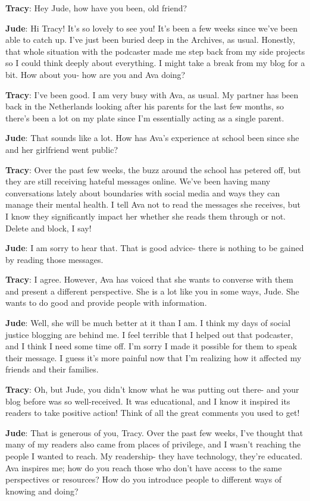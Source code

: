 \documentclass[
  letterpaper,
  DIV=11,
  numbers=noendperiod]{scrreprt}
\begin{document}
\textbf{Tracy}: Hey Jude, how have you been, old friend?

\textbf{Jude}: Hi Tracy! It's so lovely to see you! It's been a few
weeks since we've been able to catch up. I've just been buried deep in
the Archives, as usual. Honestly, that whole situation with the
podcaster made me step back from my side projects so I could think
deeply about everything. I might take a break from my blog for a bit.
How about you- how are you and Ava doing?

\textbf{Tracy}: I've been good. I am very busy with Ava, as usual. My
partner has been back in the Netherlands looking after his parents for
the last few months, so there's been a lot on my plate since I'm
essentially acting as a single parent.

\textbf{Jude}: That sounds like a lot. How has Ava's experience at
school been since she and her girlfriend went public?

\textbf{Tracy}: Over the past few weeks, the buzz around the school has
petered off, but they are still receiving hateful messages online. We've
been having many conversations lately about boundaries with social media
and ways they can manage their mental health. I tell Ava not to read the
messages she receives, but I know they significantly impact her whether
she reads them through or not. Delete and block, I say!

\textbf{Jude}: I am sorry to hear that. That is good advice- there is
nothing to be gained by reading those messages.

\textbf{Tracy}: I agree. However, Ava has voiced that she wants to
converse with them and present a different perspective. She is a lot
like you in some ways, Jude. She wants to do good and provide people
with information.

\textbf{Jude}: Well, she will be much better at it than I am. I think my
days of social justice blogging are behind me. I feel terrible that I
helped out that podcaster, and I think I need some time off. I'm sorry I
made it possible for them to speak their message. I guess it's more
painful now that I'm realizing how it affected my friends and their
families.

\textbf{Tracy}: Oh, but Jude, you didn't know what he was putting out
there- and your blog before was so well-received. It was educational,
and I know it inspired its readers to take positive action! Think of all
the great comments you used to get!

\textbf{Jude}: That is generous of you, Tracy. Over the past few weeks,
I've thought that many of my readers also came from places of privilege,
and I wasn't reaching the people I wanted to reach. My readership- they
have technology, they're educated. Ava inspires me; how do you reach
those who don't have access to the same perspectives or resources? How
do you introduce people to different ways of knowing and doing?
\end{document}
